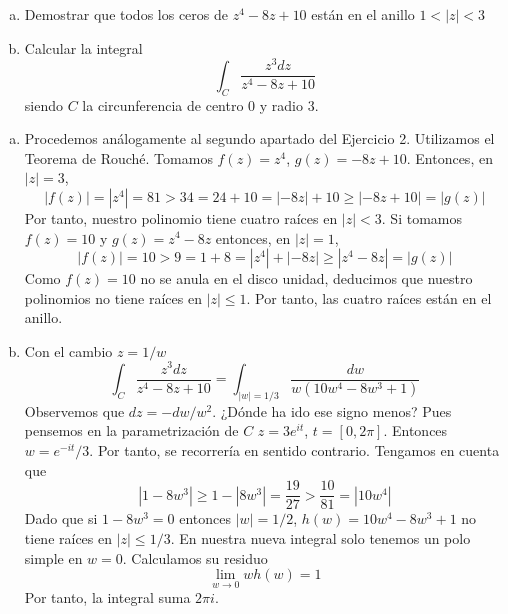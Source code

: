 \documentclass[twoside]{article}
\begin{document}
\begin{ejercicio}{7}
\begin{enumerate}[(a)]
\item Demostrar que todos los ceros de $z^4-8z+10$ están en el anillo $1<|z|<3$
\item Calcular la integral $$\int_C \frac{z^3dz}{z^4-8z+10}$$
siendo $C$ la circunferencia de centro $0$ y radio $3$.
\end{enumerate}
\end{ejercicio}
\begin{solucion}
\begin{enumerate}[(a)]
\item Procedemos análogamente al segundo apartado del Ejercicio 2. Utilizamos el Teorema de Rouché. Tomamos $f(z)=z^4$, $g(z)=-8z+10$. Entonces, en $|z|=3$,
$$
|f(z)|=|z^4| = 81 > 34 = 24 + 10 = |-8z|+10 \geq |-8z+10| = |g(z)|
$$
Por tanto, nuestro polinomio tiene cuatro raíces en $|z|<3$. Si tomamos $f(z)=10$ y $g(z)=z^4-8z$ entonces, en $|z|=1$,
$$
|f(z)| = 10 > 9 = 1+8 = |z^4|+|-8z| \geq |z^4-8z| =|g(z)|
$$
Como $f(z)=10$ no se anula en el disco unidad, deducimos que nuestro polinomios no tiene raíces en $|z|\leq 1$. Por tanto, las cuatro raíces están en el anillo. 
\item Con el cambio $z=1/w$
$$
\int_C \frac{z^3dz}{z^4-8z+10} = \int_{|w|=1/3} \frac{dw}{w(10w^4-8w^3+1)}
$$
Observemos que $dz = -dw/w^2$. ¿Dónde ha ido ese signo menos? Pues pensemos en la parametrización de $C$ $z=3e^{it}$, $t=[0,2\pi]$. Entonces $w=e^{-it}/3$. Por tanto, se recorrería en sentido contrario. Tengamos en cuenta que 
$$
|1-8w^3| \geq 1-|8w^3| = \frac{19}{27} > \frac{10}{81} = |10w^4|
$$
Dado que si $1-8w^3=0$ entonces $|w|=1/2$, $h(w)=10w^4-8w^3+1$ no tiene raíces en $|z|\leq 1/3$. En nuestra nueva integral solo tenemos un polo simple en $w=0$. Calculamos su residuo
$$
\lim_{w\to 0}wh(w) = 1
$$
Por tanto, la integral suma $2\pi i$.
\end{enumerate}
\end{solucion}
\newpage
\end{document}
